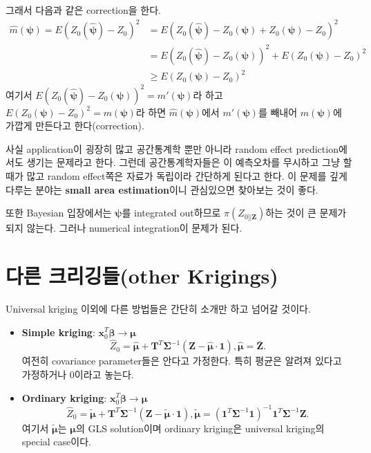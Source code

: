 \documentclass[b5paper,]{scrbook}
\theoremstyle{plain}
\theoremstyle{definition}
\numberwithin{equation}{section}
\begin{document}
그래서 다음과 같은 correction을 한다.
\[
\begin{aligned}
\hat{m}(\boldsymbol{\psi})=E(Z_{0}(\hat{\boldsymbol{\psi}})-Z_{0})^{2}&=E(Z_{0}(\hat{\boldsymbol{\psi}})-Z_{0}(\boldsymbol{\psi})+Z_{0}(\boldsymbol{\psi})-Z_{0})^2\\
&=E(Z_{0}(\hat{\boldsymbol{\psi}})-Z_{0}(\boldsymbol{\psi}))^{2}+E(Z_{0}(\boldsymbol{\psi})-Z_{0})^2\\
&\geq E(Z_{0}(\boldsymbol{\psi})-Z_{0})^2
\end{aligned}
\]
여기서 \(E(Z_{0}(\hat{\boldsymbol{\psi}})-Z_{0}(\boldsymbol{\psi}))^{2}=m'(\boldsymbol{\psi})\)라 하고 \(E(Z_{0}(\boldsymbol{\psi})-Z_{0})^2=m(\boldsymbol{\psi})\)라 하면 \(\hat{m}(\boldsymbol{\psi})\)에서 \(m'(\boldsymbol{\psi})\)를 빼내어 \(m(\boldsymbol{\psi})\)에 가깝게 만든다고 한다(correction).

사실 application이 굉장히 많고 공간통계학 뿐만 아니라 random effect prediction에서도 생기는 문제라고 한다. 그런데 공간통계학자들은 이 예측오차를 무시하고 그냥 할 때가 많고 random effect쪽은 자료가 독립이라 간단하게 된다고 한다. 이 문제를 깊게 다루는 분야는 \textbf{small area estimation}이니 관심있으면 찾아보는 것이 좋다.

또한 Bayesian 입장에서는 \(\boldsymbol{\psi}\)를 integrated out하므로 \(\pi(Z_{0]|\mathbf{Z}})\)하는 것이 큰 문제가 되지 않는다. 그러나 numerical integration이 문제가 된다.

\hypertarget{-other-krigings}{%
\section{다른 크리깅들(other Krigings)}\label{-other-krigings}}

Universal kriging 이외에 다른 방법들은 간단히 소개만 하고 넘어갈 것이다.

\begin{itemize}
\item
  \textbf{Simple kriging}: \(\mathbf{x}_{0}^{T}\boldsymbol{\beta} \rightarrow \boldsymbol{\mu}\)
  \[\hat{Z}_{0}=\hat{\boldsymbol{\mu}}+\mathbf{T}^{T}\boldsymbol{\Sigma}^{-1}(\mathbf{Z}-\hat{\boldsymbol{\mu}}\cdot \mathbf{1}), \hat{\mathbf{\mu}}=\bar{\mathbf{Z}}.\]
  여전히 covariance parameter들은 안다고 가정한다. 특히 평균은 알려져 있다고 가정하거나 0이라고 놓는다.
\item
  \textbf{Ordinary kriging}: \(\mathbf{x}_{0}^{T}\boldsymbol{\beta} \rightarrow \boldsymbol{\mu}\)
  \[\hat{Z}_{0}=\tilde{\boldsymbol{\mu}}+\mathbf{T}^{T}\boldsymbol{\Sigma}^{-1}(\mathbf{Z}-\tilde{\boldsymbol{\mu}}\cdot \mathbf{1}), \tilde{\boldsymbol{\mu}}=(\mathbf{1}^{T}\boldsymbol{\Sigma}^{-1}\mathbf{1})^{-1}\mathbf{1}^{T}\boldsymbol{\Sigma}^{-1}\mathbf{Z}.\]
  여기서 \(\tilde{\boldsymbol{\mu}}\)는 \(\boldsymbol{\mu}\)의 GLS solution이며 ordinary kriging은 universal kriging의 special case이다.
\end{itemize}
\end{document}
